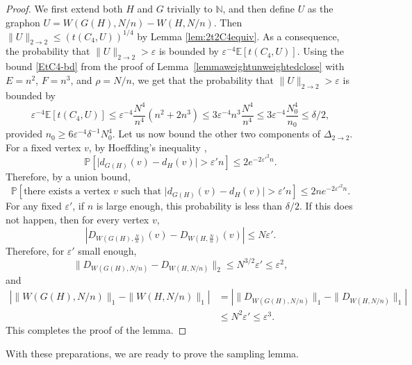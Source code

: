 \documentclass{amsart}
\numberwithin{equation}{section}
\numberwithin{figure}{section}
\theoremstyle{definition}
\theoremstyle{remark}
\newcommand{\eps}{\varepsilon}
\newcommand{\EE}{\mathbb{E}}
\newcommand{\PP}{\mathbb{P}}
\newcommand{\NN}{\mathbb{N}}
\begin{document}
\begin{proof}
We first extend both $H$ and $G$ trivially to $\NN$, and then define $U$ as
the graphon $U=W(G(H),N/n)-W(H,N/n)$. Then $\|U\|_{2 \rightarrow 2} \le
\left(t(C_4,U)\right)^{1/4}$ by Lemma \ref{lem:2t2C4equiv}. As a consequence,
the probability that $\|U\|_{2 \to 2}>\varepsilon$ is bounded by
$\eps^{-4}\EE[t(C_4,U)]$. Using the bound \eqref{EtC4-bd} from the proof of
Lemma~\ref{lemmaweightunweightedclose} with $E=n^2$, $F=n^3$, and $\rho=N/n$,
we get that the probability that $\|U\|_{2 \to 2}>\varepsilon$ is bounded by
\[\eps^{-4}\EE[t(C_4,U)] \le \eps^{-4} \frac{N^4}{n^4}\left( n^2 + 2 n^3\right)
\leq 3 \eps^{-4}n^3\frac{N^4}{n^4}\leq 3\eps^{-4}\frac{N_0^4}{n_0}\leq\delta/2,
\]
provided $n_0\geq6\eps^{-4}\delta^{-1} N_0^4$. Let us now bound the other two
components of $\Delta_{2\to 2}$. For a fixed vertex $v$, by Hoeffding's
inequality \cite{H63},
\[\PP[\lvert d_{G(H)}(v)-d_H(v)\rvert > \varepsilon' n] \le 2e^{-{2} {\varepsilon'}^2 n}.
\]
Therefore, by a union bound,
\[\PP[\text{there exists a vertex $v$ such that }\lvert d_{G(H)}(v)-d_H(v)\rvert > \varepsilon' n] \le 2ne^{- {2}{\varepsilon'}^2 n}.
\]
For any fixed $\varepsilon'$, if $n$ is large enough, this probability is
less than $\delta/2$. If this does not happen, then for every vertex $v$,
\[
\left| D_{W(G(H),\frac{N}{n})}(v)-D_{W(H,\frac{N}{n})}(v)\right| \le
N\varepsilon' .\] Therefore, for $\varepsilon'$ small enough,
\[\|D_{W(G(H),N/n)}-D_{W(H,N/n)}\|_2 \le {N^{3/2}{\eps'}\leq}\varepsilon^2
,\] and
\begin{align*}\left|\|W(G(H),N/n)\|_1-\|W(H,N/n)\|_1\right|
&=
\left|\|D_{W(G(H),N/n)}\|_1-\|D_{W(H,N/n)}\|_1\right|\\
&\le N^2\eps'\le \varepsilon^3.
\end{align*}
This completes the proof of the lemma.
\end{proof}

With these preparations, we are ready to prove the sampling lemma.
\end{document}
